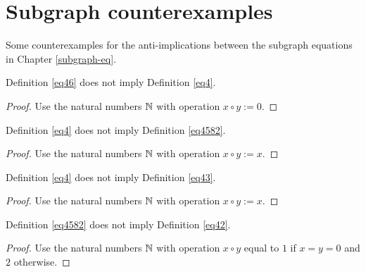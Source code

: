\chapter{Subgraph counterexamples}

Some counterexamples for the anti-implications between the subgraph equations in Chapter \ref{subgraph-eq}.

\begin{theorem}\label{46_not_imply_4}\leanok{} Definition \ref{eq46} does not imply Definition \ref{eq4}.
\end{theorem}

\begin{proof}\leanok Use the natural numbers $\mathbb{N}$ with operation $x \circ y := 0$.
\end{proof}

\begin{theorem}\label{4_not_imply_4582}\leanok{} Definition \ref{eq4} does not imply Definition \ref{eq4582}.
\end{theorem}

\begin{proof}\leanok Use the natural numbers $\mathbb{N}$ with operation $x \circ y := x$.
\end{proof}

\begin{theorem}\label{4_not_imply_43}\leanok{} Definition \ref{eq4} does not imply Definition \ref{eq43}.
\end{theorem}

\begin{proof}\leanok Use the natural numbers $\mathbb{N}$ with operation $x \circ y := x$.
\end{proof}

\begin{theorem}\label{4582_not_imply_42}\leanok{} Definition \ref{eq4582} does not imply Definition \ref{eq42}.
\end{theorem}

\begin{proof}\leanok Use the natural numbers $\mathbb{N}$ with operation
$x \circ y$ equal to $1$ if $x=y=0$ and $2$ otherwise.
\end{proof}

